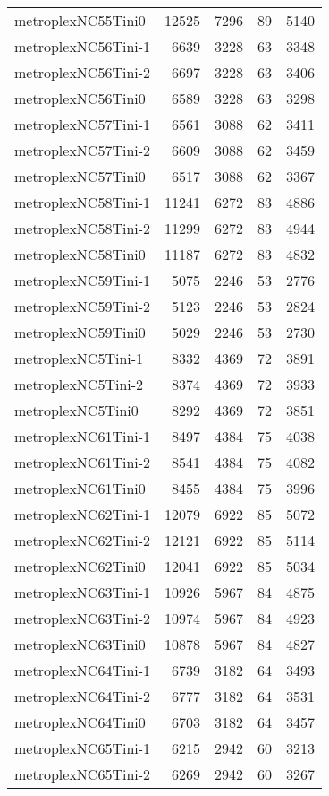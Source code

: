 \begin{longtable}{lrrrr}
metroplexNC55Tini0 & 12525 & 7296 & 89 & 5140 \\
metroplexNC56Tini-1 & 6639 & 3228 & 63 & 3348 \\
metroplexNC56Tini-2 & 6697 & 3228 & 63 & 3406 \\
metroplexNC56Tini0 & 6589 & 3228 & 63 & 3298 \\
metroplexNC57Tini-1 & 6561 & 3088 & 62 & 3411 \\
metroplexNC57Tini-2 & 6609 & 3088 & 62 & 3459 \\
metroplexNC57Tini0 & 6517 & 3088 & 62 & 3367 \\
metroplexNC58Tini-1 & 11241 & 6272 & 83 & 4886 \\
metroplexNC58Tini-2 & 11299 & 6272 & 83 & 4944 \\
metroplexNC58Tini0 & 11187 & 6272 & 83 & 4832 \\
metroplexNC59Tini-1 & 5075 & 2246 & 53 & 2776 \\
metroplexNC59Tini-2 & 5123 & 2246 & 53 & 2824 \\
metroplexNC59Tini0 & 5029 & 2246 & 53 & 2730 \\
metroplexNC5Tini-1 & 8332 & 4369 & 72 & 3891 \\
metroplexNC5Tini-2 & 8374 & 4369 & 72 & 3933 \\
metroplexNC5Tini0 & 8292 & 4369 & 72 & 3851 \\
metroplexNC61Tini-1 & 8497 & 4384 & 75 & 4038 \\
metroplexNC61Tini-2 & 8541 & 4384 & 75 & 4082 \\
metroplexNC61Tini0 & 8455 & 4384 & 75 & 3996 \\
metroplexNC62Tini-1 & 12079 & 6922 & 85 & 5072 \\
metroplexNC62Tini-2 & 12121 & 6922 & 85 & 5114 \\
metroplexNC62Tini0 & 12041 & 6922 & 85 & 5034 \\
metroplexNC63Tini-1 & 10926 & 5967 & 84 & 4875 \\
metroplexNC63Tini-2 & 10974 & 5967 & 84 & 4923 \\
metroplexNC63Tini0 & 10878 & 5967 & 84 & 4827 \\
metroplexNC64Tini-1 & 6739 & 3182 & 64 & 3493 \\
metroplexNC64Tini-2 & 6777 & 3182 & 64 & 3531 \\
metroplexNC64Tini0 & 6703 & 3182 & 64 & 3457 \\
metroplexNC65Tini-1 & 6215 & 2942 & 60 & 3213 \\
metroplexNC65Tini-2 & 6269 & 2942 & 60 & 3267 \\

\end{longtable}
